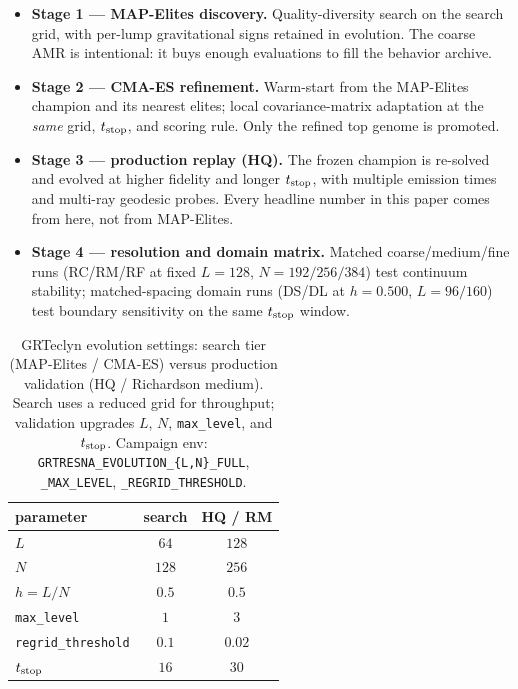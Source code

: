 \documentclass[twocolumn,floatfix,aps,prd,nofootinbib]{revtex4-2}
\begin{document}
\begin{itemize}
    \item \textbf{Stage 1 --- MAP-Elites discovery.} Quality-diversity search
    on the search grid, with per-lump gravitational signs retained in
    evolution. The coarse AMR is intentional: it buys enough evaluations to
    fill the behavior archive.
    \item \textbf{Stage 2 --- CMA-ES refinement.} Warm-start from the
    MAP-Elites champion and its nearest elites; local covariance-matrix
    adaptation at the \emph{same} grid, $t_{\rm stop}$, and scoring rule. Only
    the refined top genome is promoted.
    \item \textbf{Stage 3 --- production replay (HQ).} The frozen champion is
    re-solved and evolved at higher fidelity and longer $t_{\rm stop}$, with
    multiple emission times and multi-ray geodesic probes. Every headline
    number in this paper comes from here, not from MAP-Elites.
    \item \textbf{Stage 4 --- resolution and domain matrix.} Matched
    coarse/medium/fine runs (RC/RM/RF at fixed $L=128$, $N=192/256/384$) test
    continuum stability; matched-spacing domain runs (DS/DL at $h=0.500$,
    $L=96/160$) test boundary sensitivity on the same $t_{\rm stop}$ window.
\end{itemize}

\begin{table}[tbp]
\caption{GRTeclyn evolution settings: search tier (MAP-Elites / CMA-ES)
versus production validation (HQ / Richardson medium). Search uses a
reduced grid for throughput; validation upgrades $L$, $N$,
\texttt{max\_level}, and $t_{\rm stop}$.
Campaign env:
\texttt{GRTRESNA\_EVOLUTION\_\{L,N\}\_FULL},
\texttt{\_MAX\_LEVEL},
\texttt{\_REGRID\_THRESHOLD}.}
\label{tab:search_vs_hq_grid}
\begin{ruledtabular}
\begin{tabular}{lcc}
parameter & search & HQ / RM \\
\hline
$L$ & $64$ & $128$ \\
$N$ & $128$ & $256$ \\
$h=L/N$ & $0.5$ & $0.5$ \\
\texttt{max\_level} & $1$ & $3$ \\
\texttt{regrid\_threshold} & $0.1$ & $0.02$ \\
$t_{\rm stop}$ & $16$ & $30$ \\
\end{tabular}
\end{ruledtabular}
\end{table}
\end{document}
